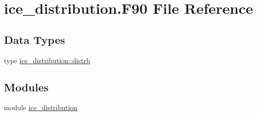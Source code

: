 \hypertarget{ice__distribution_8F90}{
\section{ice\_\-distribution.F90 File Reference}
\label{ice__distribution_8F90}
}
\subsection*{Data Types}
\begin{DoxyCompactItemize}
\item 
type \hyperlink{typeice__distribution_1_1distrb}{ice\_\-distribution::distrb}
\end{DoxyCompactItemize}
\subsection*{Modules}
\begin{DoxyCompactItemize}
\item 
module \hyperlink{namespaceice__distribution}{ice\_\-distribution}
\end{DoxyCompactItemize}
